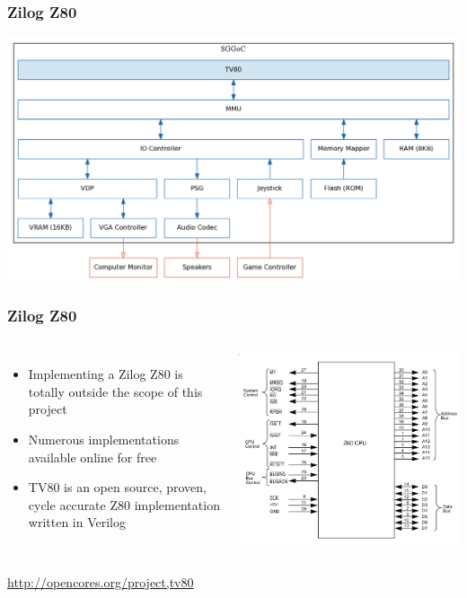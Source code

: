 \documentclass{beamer}
\newlength{\wideitemsep}
\let\olditem\item
\renewcommand{\item}{\setlength{\itemsep}{\wideitemsep}\olditem}
\begin{document}
\begin{frame}
    \frametitle{Zilog Z80}
    \begin{center}
        \includegraphics[width=\textwidth]{../block_diagrams/block_diagram_internal_tv80.png}
    \end{center}
\end{frame}

\begin{frame}
    \frametitle{Zilog Z80}

    \begin{columns}[c]
        \begin{itemize}
            \item<1-> Implementing a Zilog Z80 is totally outside the scope of this project
            \item<2-> Numerous implementations available online for free
            \item<3-> TV80 is an open source, proven, cycle accurate Z80 implementation written in Verilog
        \end{itemize}

            \includegraphics[width=\textwidth]{../images/z80.png}
    \end{columns}
    \vspace{0.5cm}
     { \url{http://opencores.org/project,tv80}}

\end{frame}
\end{document}
